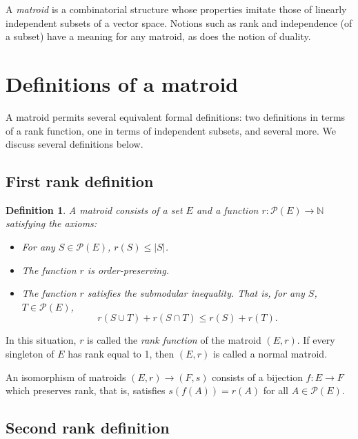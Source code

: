 \documentclass[12pt]{article}
\newtheorem{definition}{Definition}
\begin{document}

A {\em matroid} is a combinatorial structure whose properties imitate those of linearly independent subsets of a vector space.  Notions such as rank and independence (of a subset) have a meaning for any matroid, as does the notion of duality.

\section{Definitions of a matroid}

A matroid permits several equivalent formal definitions: two definitions
in terms of a rank function, one in terms of independent subsets, and
several more.  We discuss several definitions below.

\subsection*{First rank definition}

\begin{definition}
A matroid consists of a set $E$ and a function $r\colon\mathcal{P}(E)\to\mathbb{N}$ satisfying the axioms:

\begin{itemize}
\item[r1] For any $S\in\mathcal{P}(E)$, $r(S)\le |S|$.
\item[r2] The function $r$ is order-preserving.
\item[r3] The function $r$ satisfies the submodular inequality.  That is, for any $S$, $T\in\mathcal{P}(E)$,
\[
r(S\cup T) + r(S\cap T) \le r(S)+r(T).
\]
\end{itemize}
\end{definition}

In this situation, $r$ is called the {\em rank function} of the matroid $(E,r)$.   If every singleton of $E$ has rank equal to 1, then $(E,r)$ is called a normal matroid. 

An isomorphism of matroids $(E,r)\to(F,s)$ consists of a bijection $f:E\to F$ which preserves rank, that is, satisfies $s(f(A))=r(A)$ for all $A\in\mathcal{P}(E)$.

\subsection*{Second rank definition}
\end{document}
